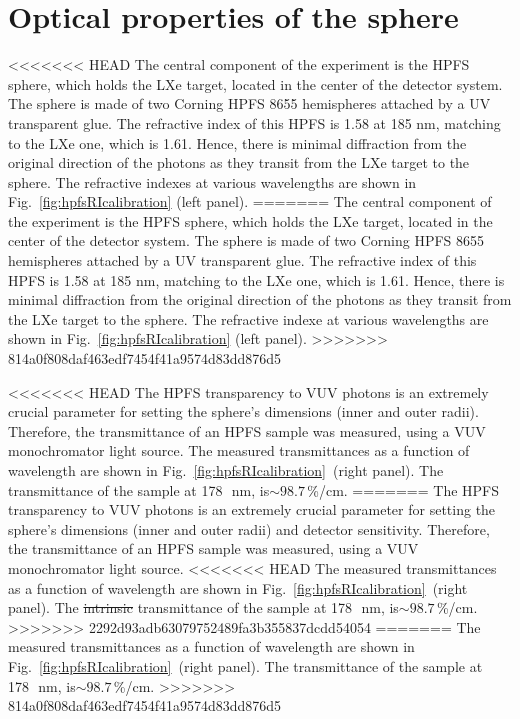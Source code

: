 \section{Optical properties of the sphere }
\label{sec:opt}

<<<<<<< HEAD
The central component of the experiment is the HPFS sphere, which holds the LXe target, located in the center 
of the detector system. The sphere is made of two Corning HPFS 8655 hemispheres attached by a UV transparent glue. 
The refractive index of this HPFS is 1.58 at 185 nm, matching to the LXe one, which is 1.61. Hence, there is minimal 
diffraction from the original direction of the photons as they transit from the LXe target to the sphere. The refractive 
indexes at various wavelengths are shown in Fig.~\ref{fig:hpfsRIcalibration} (left panel).
=======
The central component of the experiment is the HPFS sphere, which holds the LXe target, located in the center of the detector system. The sphere is made of two Corning HPFS 8655 hemispheres attached by a UV transparent glue. The refractive index of this HPFS is 1.58 at 185 nm, matching to the LXe one, which is 1.61. Hence, there is minimal diffraction from the original direction of the photons as they transit from the LXe target to the sphere. The refractive indexe at various wavelengths are shown in Fig.~\ref{fig:hpfsRIcalibration} (left panel).
>>>>>>> 814a0f808daf463edf7454f41a9574d83dd876d5


<<<<<<< HEAD
The HPFS transparency to VUV photons is an extremely crucial parameter for setting the sphere's dimensions (inner and outer radii). 
Therefore, the transmittance of an HPFS sample was measured, using a VUV monochromator light source. 
The measured transmittances as a function of wavelength are shown in Fig.~\ref{fig:hpfsRIcalibration}~(right panel). The 
transmittance of the sample at 178~\,nm, is$\sim98.7$\,\%/cm.  
=======
The HPFS transparency to VUV photons is an extremely crucial parameter for setting the sphere's dimensions (inner and outer radii) and detector sensitivity. Therefore, the transmittance of an HPFS sample was measured, using a VUV monochromator light source. 
<<<<<<< HEAD
The measured transmittances as a function of wavelength are shown in Fig.~\ref{fig:hpfsRIcalibration}~(right panel). The \sout{intrinsic} transmittance of the sample at 178~\,nm, is$\sim98.7$\,\%/cm.  
>>>>>>> 2292d93adb63079752489fa3b355837dcdd54054
=======
The measured transmittances as a function of wavelength are shown in Fig.~\ref{fig:hpfsRIcalibration}~(right panel). The transmittance of the sample at 178~\,nm, is$\sim98.7$\,\%/cm.  
>>>>>>> 814a0f808daf463edf7454f41a9574d83dd876d5

